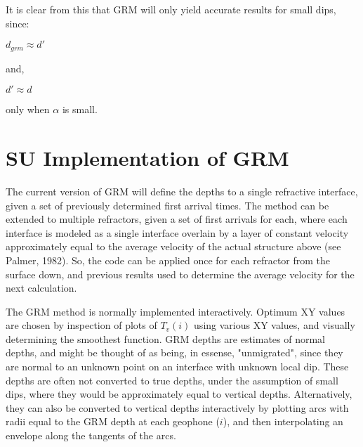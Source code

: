 {It is clear from this that GRM will only yield accurate results for small dips,
since:
	\begin{center}
	\( d_{grm}\approx d' \)
	\end{center}
and,
	\begin{center}
	\( d' \approx d \)
	\end{center}
only when $\alpha$ is small.

\section*{SU Implementation of GRM}

The current version of GRM will define the depths to
a single refractive interface, given a set of previously determined first
arrival times.  The method can be extended to multiple refractors,
given a set of first arrivals for each, where each interface is 
modeled as a single interface overlain by a layer of constant velocity
approximately equal to the average velocity of the actual structure
above (see Palmer, 1982).  So, the code can be applied once for each
refractor from the surface down, and previous results used to determine
the average velocity for the next calculation. 

The GRM method is normally implemented interactively. Optimum XY values
are chosen by inspection of plots of $T_{v}(i)$ using various XY values,
and visually determining the smoothest function.
GRM depths are estimates of normal depths, and might be thought of as 
being, in essense, "unmigrated", since they are normal to an unknown
point on an interface with unknown local dip.
These depths are often not converted to true depths, under the assumption
of small dips, where they would be approximately equal to vertical depths.
Alternatively, they can also be converted to vertical depths interactively
by plotting arcs with radii
equal to the GRM depth at each geophone ($i$), and then interpolating an
envelope along the tangents of the arcs. 

}
